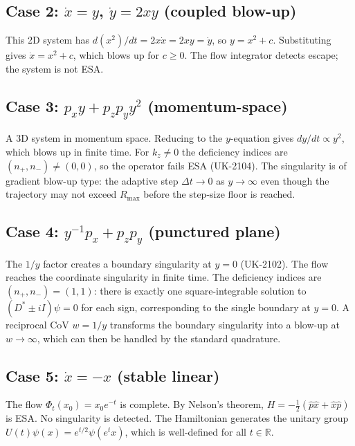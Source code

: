 \documentclass[11pt,a4paper]{article}
\newcommand{\Rset}{\mathbb{R}}
\begin{document}
\subsection{Case 2: $\dot{x}=y$, $\dot{y}=2xy$ (coupled blow-up)}

This 2D system has $d(x^{2})/dt=2x\dot{x}=2xy=\dot{y}$, so
$y=x^{2}+c$.  Substituting gives $\dot{x}=x^{2}+c$, which blows up for
$c\geq 0$.  The flow integrator detects escape; the system is not ESA.

\subsection{Case 3: $p_{x}y+p_{z}p_{y}y^{2}$ (momentum-space)}

A 3D system in momentum space.  Reducing to the $y$-equation gives
$dy/dt\propto y^{2}$, which blows up in finite time.  For $k_{z}\neq 0$
the deficiency indices are $(n_{+},n_{-})\neq(0,0)$, so the operator
fails ESA (UK-2104).  The singularity is of gradient blow-up type: the
adaptive step $\Delta t\to 0$ as $y\to\infty$ even though the trajectory
may not exceed $R_{\max}$ before the step-size floor is reached.

\subsection{Case 4: $y^{-1}p_{x}+p_{z}p_{y}$ (punctured plane)}

The $1/y$ factor creates a boundary singularity at $y=0$ (UK-2102).
The flow reaches the coordinate singularity in finite time.  The
deficiency indices are $(n_{+},n_{-})=(1,1)$: there is exactly one
square-integrable solution to $(D^{*}\pm iI)\psi=0$ for each sign,
corresponding to the single boundary at $y=0$.  A reciprocal CoV
$w=1/y$ transforms the boundary singularity into a blow-up at
$w\to\infty$, which can then be handled by the standard quadrature.

\subsection{Case 5: $\dot{x}=-x$ (stable linear)}

The flow $\Phi_{t}(x_{0})=x_{0}e^{-t}$ is complete.  By Nelson's
theorem, $H=-\tfrac{1}{2}(\hat{p}\hat{x}+\hat{x}\hat{p})$ is ESA.  No
singularity is detected.  The Hamiltonian generates the unitary group
$U(t)\psi(x)=e^{t/2}\psi(e^{t}x)$, which is well-defined for all
$t\in\Rset$.

\end{document}
